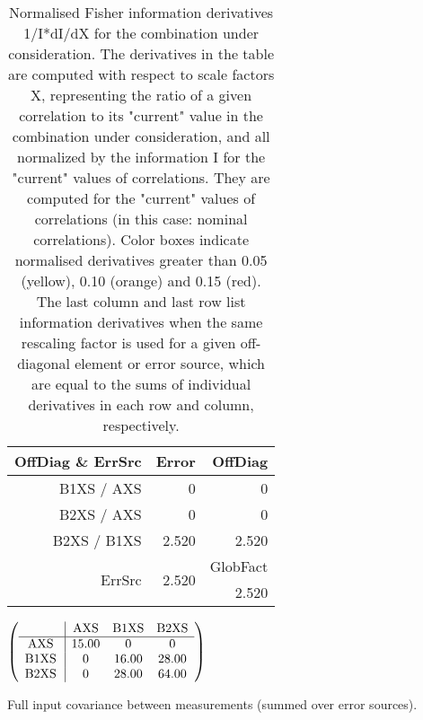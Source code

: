 \begin{table}[H]
\scriptsize
\begin{center}
\renewcommand{\arraystretch}{1.1}
\begin{tabular}{|r|r|r|}
\hline
 OffDiag \& ErrSrc & {\tiny Error} & OffDiag\\
\hline
B1XS / AXS &  0 &  0 \\
B2XS / AXS &  0 &  0 \\
B2XS / B1XS &  \colorbox{Tomato1}{    2.520} &  \colorbox{Tomato1}{    2.520} \\
\hline
\multirow{2}{*}{ErrSrc} & \multirow{2}{*}{ \colorbox{Tomato1}{    2.520}} & GlobFact\\
 & &  \colorbox{Tomato1}{    2.520} \\
\hline
\end{tabular}
\renewcommand{\arraystretch}{1}
\caption{Normalised Fisher information derivatives 1/I*dI/dX for the combination under consideration. The derivatives in the table are computed with respect to scale factors X, representing the ratio of a given correlation to its "current" value in the combination under consideration, and all normalized by the information I for the "current" values of correlations. They are computed for the "current" values of correlations (in this case: nominal correlations). Color boxes indicate normalised derivatives greater than 0.05 (yellow), 0.10 (orange) and 0.15 (red). The last column and last row list information derivatives when the same rescaling factor is used for a given off-diagonal element or error source, which are equal to the sums of individual derivatives in each row and column, respectively.}
\end{center}
\end{table}
\begin{table}[H]
\scriptsize
\begin{center}
\renewcommand{\arraystretch}{1.1}
\begin{math}\left(\begin{array}{c|ccc}
 & \mathrm{AXS} & 
\mathrm{B1XS} & 
\mathrm{B2XS} \\
\hline
\mathrm{AXS} \hspace*{2pt} &      15.00 &  0 &  0 \\
\mathrm{B1XS} \hspace*{2pt} &  0 &      16.00 &      28.00 \\
\mathrm{B2XS} \hspace*{2pt} &  0 &      28.00 &      64.00 \\
\end{array}\right)\end{math}
\caption{Full input covariance between measurements (summed over error sources).}
\renewcommand{\arraystretch}{1}
\end{center}
\end{table}
